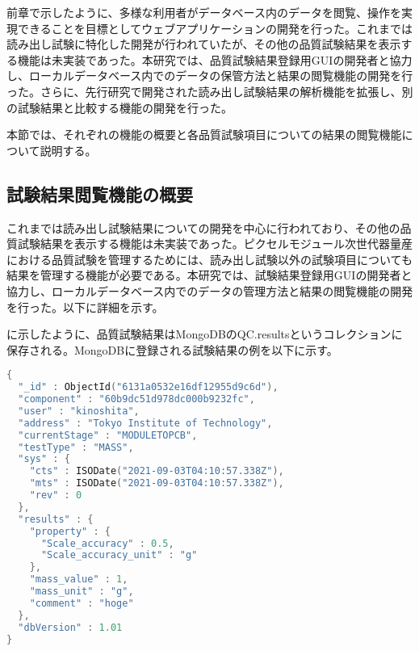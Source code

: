 前章で示したように、多様な利用者がデータベース内のデータを閲覧、操作を実現できることを目標としてウェブアプリケーションの開発を行った。これまでは読み出し試験に特化した開発が行われていたが、その他の品質試験結果を表示する機能は未実装であった。本研究では、品質試験結果登録用GUIの開発者と協力し、ローカルデータベース内でのデータの保管方法と結果の閲覧機能の開発を行った。さらに、先行研究で開発された読み出し試験結果の解析機能を拡張し、別の試験結果と比較する機能の開発を行った。

本節では、それぞれの機能の概要と各品質試験項目についての結果の閲覧機能について説明する。


\subsection{試験結果閲覧機能の概要}
\label{sec:non-elec-data}

これまでは読み出し試験結果についての開発を中心に行われており、その他の品質試験結果を表示する機能は未実装であった。ピクセルモジュール次世代器量産における品質試験を管理するためには、読み出し試験以外の試験項目についても結果を管理する機能が必要である。本研究では、試験結果登録用GUIの開発者と協力し、ローカルデータベース内でのデータの管理方法と結果の閲覧機能の開発を行った。以下に詳細を示す。

に示したように、品質試験結果はMongoDBのQC.resultsというコレクションに保存される。MongoDBに登録される試験結果の例を以下に示す。

\begin{lstlisting}[caption=品質試験結果を表すドキュメントの例。以下は質量測定結果の一つを表している。,label=code:nonele, language=C++]
{
  "_id" : ObjectId("6131a0532e16df12955d9c6d"),
  "component" : "60b9dc51d978dc000b9232fc",
  "user" : "kinoshita",
  "address" : "Tokyo Institute of Technology",
  "currentStage" : "MODULETOPCB",
  "testType" : "MASS",
  "sys" : {
    "cts" : ISODate("2021-09-03T04:10:57.338Z"),
    "mts" : ISODate("2021-09-03T04:10:57.338Z"),
    "rev" : 0
  },
  "results" : {
    "property" : {
      "Scale_accuracy" : 0.5,
      "Scale_accuracy_unit" : "g"
    },
    "mass_value" : 1,
    "mass_unit" : "g",
    "comment" : "hoge"
  },
  "dbVersion" : 1.01
}
\end{lstlisting}

